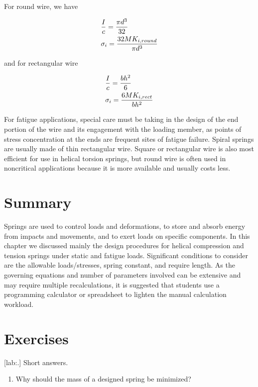 \documentclass[a4paper,openany,12pt]{book}
\begin{document}
{{For round wire, we have

$$\begin{gathered}
    \frac{I}{c} = \frac{\pi d^3}{32} \hfill \\
    \sigma_i = \frac{32MK_{i,round}}{\pi d^3} \hfill \\ 
  \end{gathered}$$

and for rectangular wire

$$\begin{gathered}
    \frac{I}{c} = \frac{bh^2}{6} \hfill \\
    \sigma_i = \frac{6MK_{i,rect}}{bh^2} \hfill \\ 
  \end{gathered}$$

For fatigue applications, special care must be taking in the design of
the end portion of the wire and its engagement with the loading member,
as points of stress concentration at the ends are frequent sites of
fatigue failure. Spiral springs are usually made of thin rectangular
wire. Square or rectangular wire is also most efficient for use in
helical torsion springs, but round wire is often used in noncritical
applications because it is more available and usually costs less.

\section{Summary}
\label{sec:orgc60444b}
Springs are used to control loads and deformations, to store and absorb
energy from impacts and movements, and to exert loads on specific
components. In this chapter we discussed mainly the design procedures
for helical compression and tension springs under static and fatigue
loads. Significant conditions to consider are the allowable
loads/stresses, spring constant, and require length. As the governing
equations and number of parameters involved can be extensive and may
require multiple recalculations, it is suggested that students use a
programming calculator or spreadsheet to lighten the manual calculation
workload.

\section{Exercises}
\label{sec:org87b29e1}
[lab:.] Short answers.

\begin{enumerate}
\item Why should the mass of a designed spring be minimized?


\end{enumerate}}}
\end{document}
